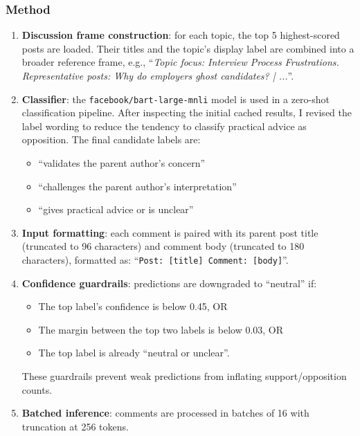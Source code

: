 \documentclass[11pt,a4paper]{article}
\begin{document}
\subsubsection{Method}

\begin{enumerate}[leftmargin=*]
  \item \textbf{Discussion frame construction}: for each topic, the top 5 highest-scored posts are loaded. Their titles and the topic's display label are combined into a broader reference frame, e.g., ``\textit{Topic focus: Interview Process Frustrations. Representative posts: Why do employers ghost candidates? | ...}''.
  
  \item \textbf{Classifier}: the \texttt{facebook/bart-large-mnli} model is used in a zero-shot classification pipeline. After inspecting the initial cached results, I revised the label wording to reduce the tendency to classify practical advice as opposition. The final candidate labels are:
  \begin{itemize}
    \item ``validates the parent author's concern''
    \item ``challenges the parent author's interpretation''
    \item ``gives practical advice or is unclear''
  \end{itemize}
  
  \item \textbf{Input formatting}: each comment is paired with its parent post title (truncated to 96 characters) and comment body (truncated to 180 characters), formatted as: ``\texttt{Post: [title] Comment: [body]}''.
  
  \item \textbf{Confidence guardrails}: predictions are downgraded to ``neutral'' if:
  \begin{itemize}
    \item The top label's confidence is below 0.45, OR
    \item The margin between the top two labels is below 0.03, OR
    \item The top label is already ``neutral or unclear''.
  \end{itemize}
  These guardrails prevent weak predictions from inflating support/opposition counts.
  
  \item \textbf{Batched inference}: comments are processed in batches of 16 with truncation at 256 tokens.
\end{enumerate}
\end{document}
